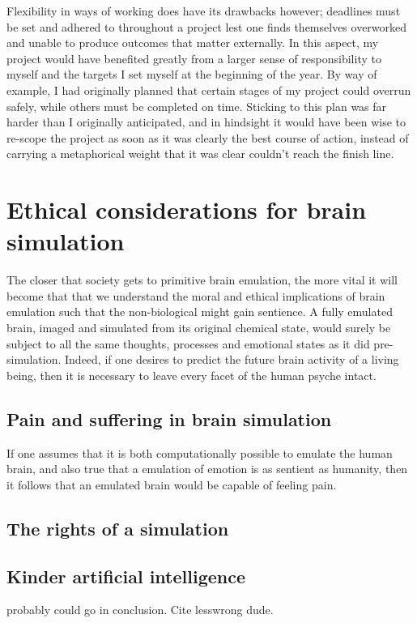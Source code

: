 Flexibility in ways of working does have its drawbacks however; deadlines must
be set and adhered to throughout a project lest one finds themselves overworked
and unable to produce outcomes that matter externally. In this aspect, my
project would have benefited greatly from a larger sense of responsibility to
myself and the targets I set myself at the beginning of the year. By way of
example, I had originally planned that certain stages of my project could
overrun safely, while others must be completed on time. Sticking to this plan
was far harder than I originally anticipated, and in hindsight it would have been
wise to re-scope the project as soon as it was clearly the best course of action,
instead of carrying a metaphorical weight that it was clear couldn't reach the
finish line.


\section{Ethical considerations for brain simulation}

The closer that society gets to primitive brain emulation, the more vital it
will become that that we understand the moral and ethical implications of brain
emulation such that the non-biological might gain sentience. A fully emulated
brain, imaged and simulated from its original chemical state, would surely be
subject to all the same thoughts, processes and emotional states as it did
pre-simulation. Indeed, if one desires to predict the future brain activity of a
living being, then it is necessary to leave every facet of the human psyche intact.



\subsection{Pain and suffering in brain simulation}

If one assumes that it is both computationally possible to emulate the human
brain, and also true that a emulation of emotion is as sentient as humanity,
then it follows that an emulated brain would be capable of feeling pain. 

\autocite{faggella_preventing_2019}
\autocite{singler_existential_2019}
 
\subsection{The rights of a simulation}

\subsection{Kinder artificial intelligence}
probably could go in conclusion. Cite lesswrong dude.

